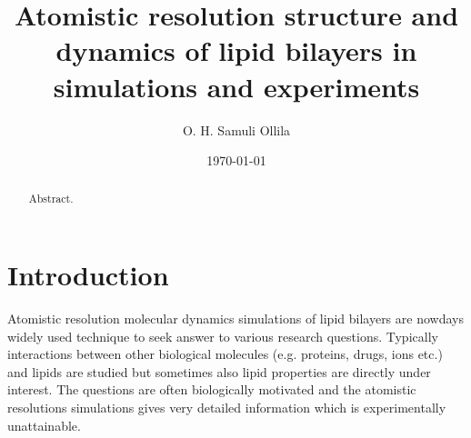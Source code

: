 \documentclass[aps,prl,superscriptaddress,twocolumn]{revtex4}
\begin{document}

\title{Atomistic resolution structure and dynamics of lipid bilayers in simulations and experiments} %



\author{O. H. Samuli Ollila}



\date{\today}

\begin{abstract}
Abstract.
\end{abstract}


\maketitle %



\section{Introduction}
Atomistic resolution molecular dynamics simulations of lipid bilayers are nowdays
widely used technique to seek answer to various research questions.
Typically interactions between other biological molecules (e.g. proteins, drugs, ions etc.)
and lipids are studied but sometimes also lipid properties are directly under interest.
The questions are often biologically motivated and the atomistic resolutions simulations
gives very detailed information which is experimentally unattainable.
\end{document}

